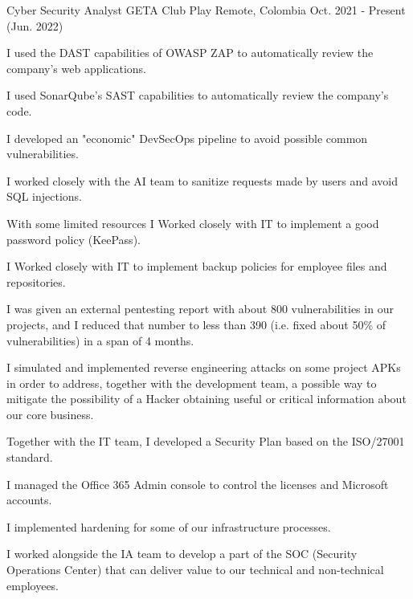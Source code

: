 

\begin{cventries}

  \cventry
    {Cyber Security Analyst} %
    {GETA Club Play} %
    {Remote, Colombia} %
    {Oct. 2021 - Present (Jun. 2022)} %
    {
      \begin{cvitems} %
        \item {I used the DAST capabilities of OWASP ZAP to automatically review the company's web
        applications.}
        \item {I used SonarQube's SAST capabilities to automatically review the company's code.}
        \item {I developed an "economic" DevSecOps pipeline to avoid possible common 
        vulnerabilities.}
        \item {I worked closely with the AI team to sanitize requests made by users and avoid SQL
        injections.}
        \item {With some limited resources I Worked closely with IT to implement a good password 
        policy (KeePass).}
        \item {I Worked closely with IT to implement backup policies for employee files and
        repositories.}
        \item {I was given an external pentesting report with about 800 vulnerabilities in our
        projects, and I reduced that number to less than 390 (i.e. fixed about 50\% of
        vulnerabilities) in a span of 4 months.}
        \item {I simulated and implemented reverse engineering attacks on some project APKs in order
        to address, together with the development team, a possible way to mitigate the possibility
        of a Hacker obtaining useful or critical information about our core business.}
        \item {Together with the IT team, I developed a Security Plan based on the ISO/27001
        standard.}
        \item {I managed the Office 365 Admin console to control the licenses and Microsoft 
        accounts.}
        \item {I implemented hardening for some of our infrastructure processes.}
        \item {I worked alongside the IA team to develop a part of the SOC (Security Operations
        Center) that can deliver value to our technical and non-technical employees.}
      \end{cvitems}
    }


\end{cventries}
